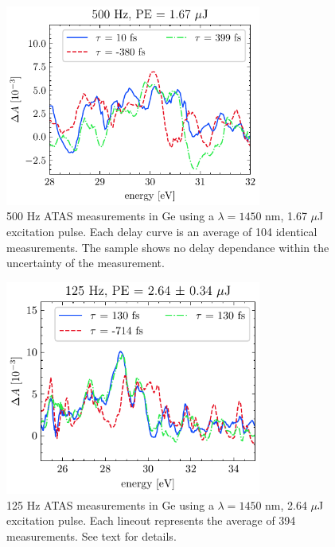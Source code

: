 \begin{figure}
	\centering
	\includegraphics[width=0.75\textwidth]{figures/chap4/StaticOD_avg_500Hz_1p67uJ.pdf}
	\caption{500 Hz ATAS measurements in Ge using a $\lambda = 1450$ nm, 1.67 $\mu$J excitation pulse. Each delay curve is an average of 104 identical measurements. The sample shows no delay dependance within the uncertainty of the measurement.}
	\label{fig:500Hz_Ge_ATAS:delays}
\end{figure}

\begin{figure}
	\centering
	\includegraphics[width=0.75\textwidth]{figures/chap4/StaticOD_avg_125Hz_2p64uJ.pdf}
	\caption{125 Hz ATAS measurements in Ge using a $\lambda = 1450$ nm, 2.64 $\mu$J excitation pulse. Each lineout represents the average of 394 measurements. See text for details.}
	\label{fig:125Hz_Ge_ATAS:static_delays}
\end{figure}

